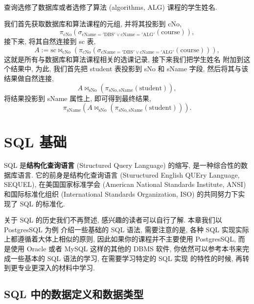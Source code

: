 \documentclass[10pt,UTF8]{book} %
\begin{document}
\begin{example}
    查询选修了数据库或者选修了算法 (algorithms, ALG) 课程的学生姓名.
    \begin{sol}
        我们首先获取数据库和算法课程的元组, 并将其投影到 cNo,
        \[ \pi_\mathrm{cNo} \left(
            \sigma_\mathrm{cName = 'DBS' \vee cName = 'ALG'} \left(
                \mathrm{course}
            \right)
        \right), \]
        接下来, 将其自然连接到 sc 表,
        \[ A := \mathrm{sc} \Join_\mathrm{cNo} \left(
            \pi_\mathrm{cNo} \left(
            \sigma_\mathrm{cName = 'DBS' \vee cName = 'ALG'} \left(
                \mathrm{course}
            \right)
        \right)
        \right), \]
        这就是所有与数据库和算法课程相关的选课记录, 接下来我们把学生姓名
        附加到这个结果中, 为此, 我们首先把 student 表投影到 sNo 和 sName 字段,
        然后将其与该结果做自然连接,
        \[ A \Join_\mathrm{sNo} \left(
            \pi_\mathrm{sNo, sName} (\mathrm{student})
        \right), \]
        将结果投影到 sName 属性上, 即可得到最终结果,
        \[ \pi_\mathrm{sName} \left(
            A \Join_\mathrm{sNo} \left(
            \pi_\mathrm{sNo, sName} (\mathrm{student})
        \right)
        \right). \]
    \end{sol}
\end{example}

\newpage
\thispagestyle{empty}

\chapter{SQL 基础}

SQL 是\textbf{结构化查询语言} (Structured Query Language) 的缩写,
是一种综合性的数据库语言.
它的前身是结构化查询语言 (Stuructured English QUEry Language, SEQUEL),
在美国国家标准学会 (American National Standards Institute, ANSI) 和国际标准化组织
(International Standards Organization, ISO) 的共同努力下实现了 SQL 的标准化.

关于 SQL 的历史我们不再赘述, 感兴趣的读者可以自行了解. 本章我们以 PostgresSQL 为例
介绍一些基础的 SQL 语法, 需要注意的是, 各种 SQL 实现实际上都遵循着大体上相似的原则,
因此如果你的课程并不主要使用 PostgresSQL, 而是使用 Oracle 或者 MySQL 这样的其他的
DBMS 软件, 你依然可以参考本书来完成一些基本的 SQL 语法的学习, 在需要学习特定的 SQL 实现
的特性的时候, 再转到更专业更深入的材料中学习.

\section{SQL 中的数据定义和数据类型}
\end{document}
